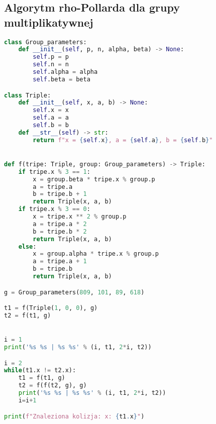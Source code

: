 \subsection*{Algorytm rho-Pollarda dla grupy multiplikatywnej}
\begin{lstlisting}[language=python, label=sage_4, caption=Algorytm rho-Pollarda dla grupy multiplikatywnej]
class Group_parameters:
    def __init__(self, p, n, alpha, beta) -> None:
        self.p = p
        self.n = n
        self.alpha = alpha
        self.beta = beta

class Triple:
    def __init__(self, x, a, b) -> None:
        self.x = x
        self.a = a
        self.b = b
    def __str__(self) -> str:
        return f"x = {self.x}, a = {self.a}, b = {self.b}"


def f(tripe: Triple, group: Group_parameters) -> Triple:
    if tripe.x % 3 == 1:
        x = group.beta * tripe.x % group.p
        a = tripe.a
        b = tripe.b + 1
        return Triple(x, a, b)
    if tripe.x % 3 == 0:
        x = tripe.x ** 2 % group.p
        a = tripe.a * 2
        b = tripe.b * 2
        return Triple(x, a, b)
    else:
        x = group.alpha * tripe.x % group.p
        a = tripe.a + 1
        b = tripe.b
        return Triple(x, a, b)

g = Group_parameters(809, 101, 89, 618)

t1 = f(Triple(1, 0, 0), g)
t2 = f(t1, g)


i = 1
print('%s %s | %s %s' % (i, t1, 2*i, t2))

i = 2
while(t1.x != t2.x):
    t1 = f(t1, g)
    t2 = f(f(t2, g), g)
    print('%s %s | %s %s' % (i, t1, 2*i, t2))
    i=i+1

print(f"Znaleziona kolizja: x: {t1.x}")
\end{lstlisting}

